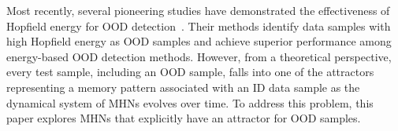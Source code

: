 Most recently, several pioneering studies have demonstrated the effectiveness of Hopfield energy for OOD detection~\cite{zhang23she, Hofmann2024boosting}.
Their methods identify data samples with high Hopfield energy as OOD samples and achieve superior performance among energy-based OOD detection methods.
However, from a theoretical perspective, every test sample, including an OOD sample, falls into one of the attractors representing a memory pattern associated with an ID data sample as the dynamical system of MHNs evolves over time.
To address this problem, this paper explores MHNs that explicitly have an attractor for OOD samples.


